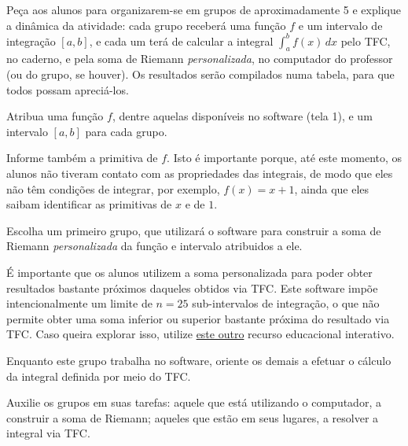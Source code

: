 \documentclass[a4paper,12pt]{scrartcl}
\begin{document}
      \begin{list}{.}{
	\setlength\leftmargin{0cm}%
	\setlength\itemindent\parindent%
	\setlength\listparindent{\parindent}%
        \setlength{}%
        \setlength{}%
      }
      
	\item Peça aos alunos para organizarem-se em grupos de aproximadamente 5 e explique a dinâmica da atividade:
	cada grupo receberá uma função $f$ e um intervalo de integração $[a,b]$, e cada um terá de calcular a integral $\int_a^b f(x)\,dx$
	pelo TFC, no caderno, e pela soma de Riemann \emph{personalizada}, no computador do professor (ou do grupo, se houver).
	Os resultados serão compilados numa tabela, para que todos possam apreciá-los.
	
	\item Atribua uma função $f$, dentre aquelas disponíveis no software (tela 1), e um intervalo $[a,b]$ para cada grupo.
	
	Informe também a primitiva de $f$. Isto é importante porque, até este momento, os alunos não tiveram contato com as propriedades das integrais,
	de modo que eles não têm condições de integrar, por exemplo, $f(x) = x + 1$, ainda que eles saibam identificar as primitivas de $x$ e de $1$.
	
	\item Escolha um primeiro grupo, que utilizará o software para construir a soma de Riemann \emph{personalizada} da função e intervalo atribuidos a ele.
	
	É importante que os alunos utilizem a soma personalizada para poder obter resultados bastante próximos daqueles obtidos via TFC.
	Este software impõe intencionalmente um limite de $n = 25$ sub-intervalos de integração, o que não permite obter uma soma inferior
	ou superior bastante próxima do resultado via TFC. Caso queira explorar isso, utilize \href{http://midia.atp.usp.br/atividades-interativas/AI-0108}{este outro} recurso educacional interativo.
	
	\item Enquanto este grupo trabalha no software, oriente os demais a efetuar o cálculo da integral definida por meio do TFC.
	
	\item Auxilie os grupos em suas tarefas: aquele que está utilizando o computador, a construir a soma de Riemann; aqueles que estão em seus lugares, a resolver a integral via TFC.
	

\end{list}
\end{document}
